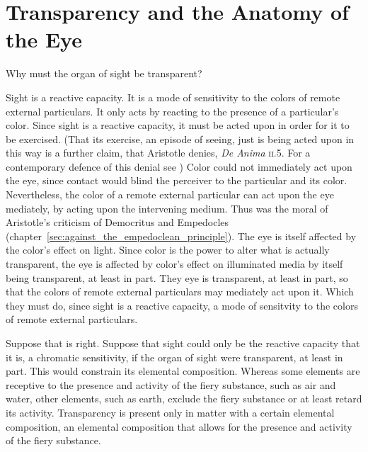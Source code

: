 
\section{Transparency and the Anatomy of the Eye} %
\label{sec:transparency_and_the_anatomy_of_the_eye}

Why must the organ of sight be transparent?

Sight is a reactive capacity. It is a mode of sensitivity to the colors of remote external particulars. It only acts by reacting to the presence of a particular's color. Since sight is a reactive capacity, it must be acted upon in order for it to be exercised. (That its exercise, an episode of seeing, just is being acted upon in this way is a further claim, that Aristotle denies, \emph{De Anima} \textsc{ii}.5. For a contemporary defence of this denial see \citealt{Travis:2009fk}) Color could not immediately act upon the eye, since contact would blind the perceiver to the particular and its color. Nevertheless, the color of a remote external particular can act upon the eye mediately, by acting upon the intervening medium. Thus was the moral of Aristotle's criticism of Democritus and Empedocles (chapter~\ref{sec:against_the_empedoclean_principle}). The eye is itself affected by the color's effect on light. Since color is the power to alter what is actually transparent, the eye is affected by color's effect on illuminated media by itself being transparent, at least in part. They eye is transparent, at least in part, so that the colors of remote external particulars may mediately act upon it. Which they must do, since sight is a reactive capacity, a mode of sensitvity to the colors of remote external particulars.

Suppose that is right. Suppose that sight could only be the reactive capacity that it is, a chromatic sensitivity, if the organ of sight were transparent, at least in part. This would constrain its elemental composition. Whereas some elements are receptive to the presence and activity of the fiery substance, such as air and water, other elements, such as earth, exclude the fiery substance or at least retard its activity. Transparency is present only in matter with a certain elemental composition, an elemental composition that allows for the presence and activity of the fiery substance.

